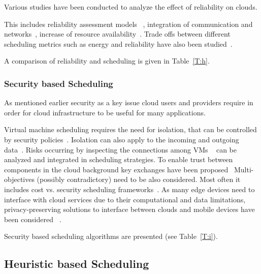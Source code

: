 \documentclass[final,5p,times,twocolumn]{elsarticle}
\begin{document}
Various studies have been conducted to analyze the effect of reliability on clouds.

This includes reliability assessment models
~\cite{malik2012reliability}, integration of communication and
networks~\cite{jing2015reliability}, increase of resource
availability~\cite{latiff2016fault}. Trade offs between different
scheduling metrics such as energy and reliability have also been
studied~\cite{tang2016energy}.

A comparison of reliability and scheduling is given in Table~\ref{T:h}.





\subsubsection{Security based Scheduling}\label{sec:security}



As mentioned earlier security as a key issue cloud users and
providers require in order for cloud infrastructure to be useful for
many applications.

Virtual machine scheduling requires the need for isolation, that can
be controlled by security
policies~\cite{afoulki2011security}. Isolation can also apply to the
incoming and outgoing data~\cite{chejerla2017qos,kashyap2014security}.
Risks occurring by inspecting the connections among VMs
~\cite{shetty2016security} can be analyzed and integrated in
scheduling strategies.  To enable trust between components in the
cloud background key exchanges have been proposed~\cite{liu2013ccbke}
Multi-objectives (possibly contradictory) need to be also
considered. Most often it includes cost vs. security scheduling
frameworks~\cite{kashyap2014security,zeng2015saba,wang2012cloud}.  As
many edge devices need to interface with cloud services due to their
computational and data limitations, privacy-preserving solutions to
interface between clouds and mobile devices have been considered
~\cite{bilogrevic2011meetings}.

Security based scheduling algorithms are presented (see
Table~\ref{T:i}). 





\subsection{Heuristic based Scheduling}\label{sec:heuristic}
\end{document}
